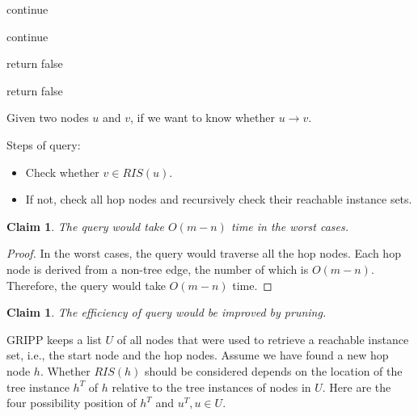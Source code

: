 \documentclass[11pt]{article}
\newtheorem{claim}[theorem]{Claim}
\begin{document}
\begin{enumerate}
\begin{algorithm}[H]
{{{					
					{continue\;}
					
					{continue\;}
					
				
					{return false\;}
				}
				return false\;
			}
		}
	\end{algorithm}  
	Given two nodes $u$ and $v$, if we want to know whether $u\rightarrow v$. 
	
	Steps of query:
	\begin{itemize}
		\item Check whether $v\in RIS(u)$.
		\item If not, check all hop nodes and recursively check their reachable instance sets.
	\end{itemize}
	\begin{claim}
		The query would take $O(m-n)$ time in the worst cases.
	\end{claim}
	\begin{proof}
		In the worst cases, the query would traverse all the hop nodes. Each hop node is derived from a non-tree edge, the number of which is $O(m-n)$. Therefore, the query would take $O(m-n)$ time.
	\end{proof}
	\begin{claim}
		The efficiency of query would be improved by pruning.
	\end{claim}
	GRIPP keeps a list $U$ of all nodes that were used to retrieve a
	reachable instance set, i.e., the start node and the hop nodes. Assume we have found a new hop node $h$. Whether $RIS(h)$ should be considered depends on the location of the tree instance $h^T$ of $h$ relative to the tree instances of nodes in $U$.
	Here are the four possibility position of $h^T$ and $u^T, u\in U$.
	\begin{figure}[H]
	\centering
\end{figure}
\end{enumerate}
\end{document}
